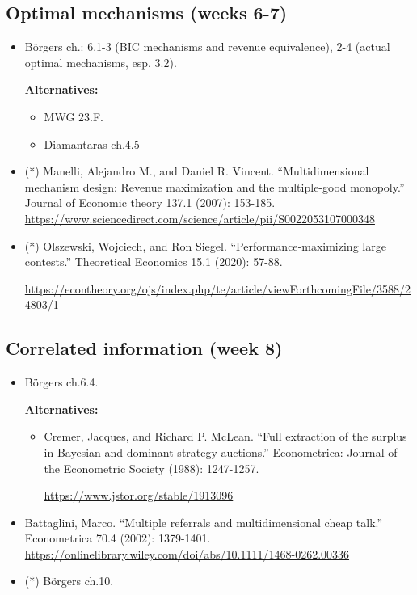 \documentclass{article}
\begin{document}
\subsection{Optimal mechanisms (weeks 6-7)}
\begin{itemize}
	\item B{\"o}rgers ch.: 6.1-3 (BIC mechanisms and revenue equivalence), 2-4 (actual optimal mechanisms, esp. 3.2).
	
	\textbf{Alternatives:}
	\begin{itemize}
		\item MWG 23.F.
		\item Diamantaras ch.4.5
	\end{itemize}
	\item (*) Manelli, Alejandro M., and Daniel R. Vincent. ``Multidimensional mechanism design: Revenue maximization and the multiple-good monopoly.'' Journal of Economic theory 137.1 (2007): 153-185. \url{https://www.sciencedirect.com/science/article/pii/S0022053107000348}
	\item (*) Olszewski, Wojciech, and Ron Siegel. ``Performance‐maximizing large contests.'' Theoretical Economics 15.1 (2020): 57-88.
	
	\url{https://econtheory.org/ojs/index.php/te/article/viewForthcomingFile/3588/24803/1}
\end{itemize}

\subsection{Correlated information (week 8)}
\begin{itemize}
	\item B{\"o}rgers ch.6.4.
	
	\textbf{Alternatives:}
	\begin{itemize}
		\item Cremer, Jacques, and Richard P. McLean. ``Full extraction of the surplus in Bayesian and dominant strategy auctions.'' Econometrica: Journal of the Econometric Society (1988): 1247-1257.
		
		\url{https://www.jstor.org/stable/1913096}
	\end{itemize}
	\item Battaglini, Marco. ``Multiple referrals and multidimensional cheap talk.'' Econometrica 70.4 (2002): 1379-1401. \url{https://onlinelibrary.wiley.com/doi/abs/10.1111/1468-0262.00336}
	
	\item (*) B{\"o}rgers ch.10.
\end{itemize}
\end{document}
